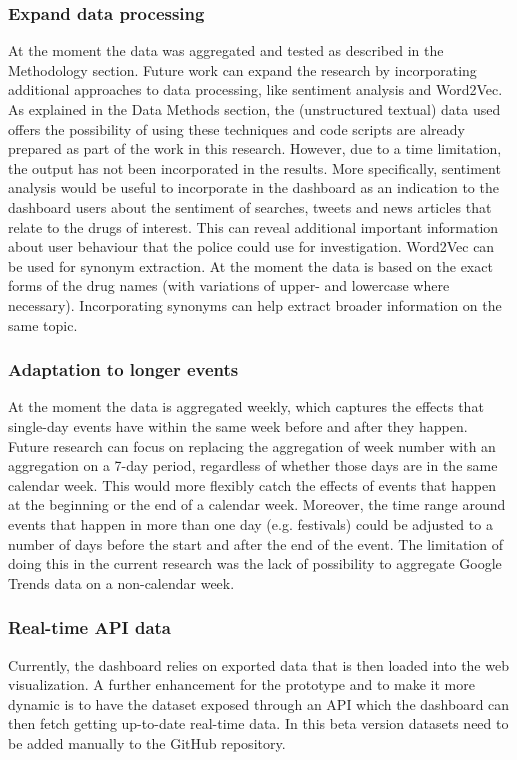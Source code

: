\subsubsection{Expand data processing}
At the moment the data was aggregated and tested as described in the Methodology section. Future work can expand the research by incorporating additional approaches to data processing, like sentiment analysis and Word2Vec. As explained in the Data Methods section, the (unstructured textual) data used offers the possibility of using these techniques and code scripts are already prepared as part of the work in this research. However, due to a time limitation, the output has not been incorporated in the results. More specifically, sentiment analysis would be useful to incorporate in the dashboard as an indication to the dashboard users about the sentiment of searches, tweets and news articles that relate to the drugs of interest. This can reveal additional important information about user behaviour that the police could use for investigation. Word2Vec can be used for synonym extraction. At the moment the data is based on the exact forms of the drug names (with variations of upper- and lowercase where necessary). Incorporating synonyms can help extract broader information on the same topic.

\subsubsection{Adaptation to longer events}
At the moment the data is aggregated weekly, which captures the effects that single-day events have within the same week before and after they happen. Future research can focus on replacing the aggregation of week number with an aggregation on a 7-day period, regardless of whether those days are in the same calendar week. This would more flexibly catch the effects of events that happen at the beginning or the end of a calendar week. Moreover, the time range around events that happen in more than one day (e.g. festivals) could be adjusted to a number of days before the start and after the end of the event. The limitation of doing this in the current research was the lack of possibility to aggregate Google Trends data on a non-calendar week. 

\subsubsection{Real-time API data}
Currently, the dashboard relies on exported data that is then loaded into the web visualization. A further enhancement for the prototype and to make it more dynamic is to have the dataset exposed through an API which the dashboard can then fetch getting up-to-date real-time data. In this beta version datasets need to be added manually to the GitHub repository.

